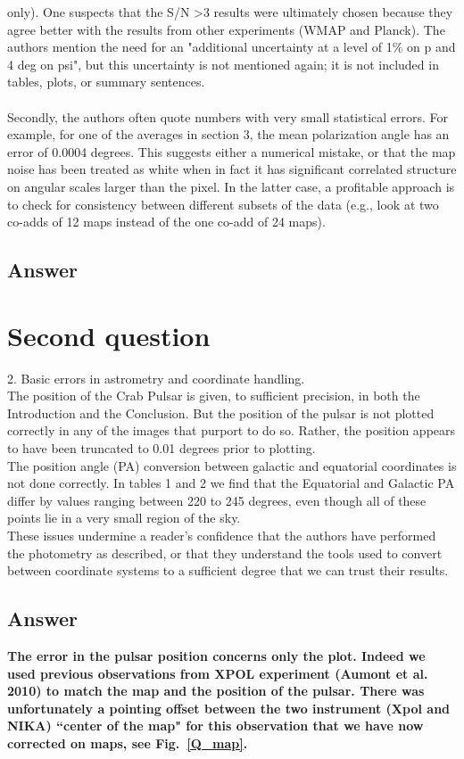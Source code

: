 \documentclass[report,onecolumn]{aa}
\begin{document}
only). One suspects that the S/N \textgreater 3 results were ultimately chosen
because they agree better with the results from other experiments
(WMAP and Planck). The authors mention the need for an "additional
uncertainty at a level of 1\% on p and 4 deg on psi", but this
uncertainty is not mentioned again; it is not included in tables,
plots, or summary sentences.
\\ \\
Secondly, the authors often quote numbers with very small statistical
errors. For example, for one of the averages in section 3, the mean
polarization angle has an error of 0.0004 degrees. This suggests
either a numerical mistake, or that the map noise has been
treated as white when in fact it has significant correlated structure
on angular scales larger than the pixel. In the latter case, a
profitable approach is to check for consistency between different
subsets of the data (e.g., look at two co-adds of 12 maps instead of
the one co-add of 24 maps).

\subsection{\textbf{Answer}}

\section{Second question}
2. Basic errors in astrometry and coordinate handling.
\\
The position of the Crab Pulsar is given, to sufficient precision, in
both the Introduction and the Conclusion. But the position of the
pulsar is not plotted correctly in any of the images that purport to
do so. Rather, the position appears to have been truncated to 0.01
degrees prior to plotting.
\\
The position angle (PA) conversion between galactic and equatorial
coordinates is not done correctly. In tables 1 and 2 we find that the
Equatorial and Galactic PA differ by values ranging between 220 to 245
degrees, even though all of these points lie in a very small region of
the sky.
\\
These issues undermine a reader's confidence that the authors have
performed the photometry as described, or that they understand the
tools used to convert between coordinate systems to a sufficient
degree that we can trust their results.
\subsection{\textbf{Answer}}
\textbf{The error in the pulsar position concerns only the plot.
Indeed we used previous observations from XPOL experiment (Aumont et al. 2010) to match the map and the position of the pulsar.
There was unfortunately a pointing offset between the two instrument (Xpol and NIKA) ``center of the map" for this observation that we have now corrected on maps, see Fig.~\ref{Q_map}.}
\end{document}

